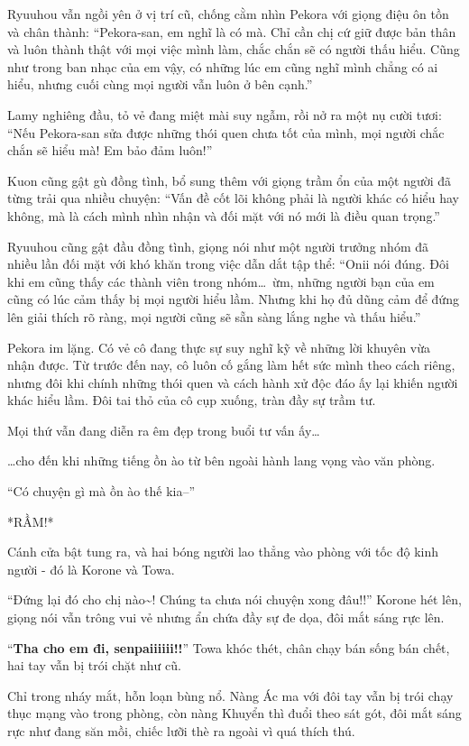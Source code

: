 \documentclass[../main.tex]{subfiles}
\begin{document}
Ryuuhou vẫn ngồi yên ở vị trí cũ, chống cằm nhìn Pekora với giọng điệu ôn tồn và chân thành: ``Pekora-san, em nghĩ là có mà. Chỉ cần chị cứ giữ được bản thân và luôn thành thật với mọi việc mình làm, chắc chắn sẽ có người thấu hiểu. Cũng như trong ban nhạc của em vậy, có những lúc em cũng nghĩ mình chẳng có ai hiểu, nhưng cuối cùng mọi người vẫn luôn ở bên cạnh.''

Lamy nghiêng đầu, tỏ vẻ đang miệt mài suy ngẫm, rồi nở ra một nụ cười tươi: ``Nếu Pekora-san sửa được những thói quen chưa tốt của mình, mọi người chắc chắn sẽ hiểu mà! Em bảo đảm luôn!''

Kuon cũng gật gù đồng tình, bổ sung thêm với giọng trầm ổn của một người đã từng trải qua nhiều chuyện: ``Vấn đề cốt lõi không phải là người khác có hiểu hay không, mà là cách mình nhìn nhận và đối mặt với nó mới là điều quan trọng.''

Ryuuhou cũng gật đầu đồng tình, giọng nói như một người trưởng nhóm đã nhiều lần đối mặt với khó khăn trong việc dẫn dắt tập thể: ``Onii nói đúng. Đôi khi em cũng thấy các thành viên trong nhóm\dots\ ừm, những người bạn của em cũng có lúc cảm thấy bị mọi người hiểu lầm. Nhưng khi họ đủ dũng cảm để đứng lên giải thích rõ ràng, mọi người cũng sẽ sẵn sàng lắng nghe và thấu hiểu.''

Pekora im lặng. Có vẻ cô đang thực sự suy nghĩ kỹ về những lời khuyên vừa nhận được. Từ trước đến nay, cô luôn cố gắng làm hết sức mình theo cách riêng, nhưng đôi khi chính những thói quen và cách hành xử độc đáo ấy lại khiến người khác hiểu lầm. Đôi tai thỏ của cô cụp xuống, tràn đầy sự trầm tư.

Mọi thứ vẫn đang diễn ra êm đẹp trong buổi tư vấn ấy\dots

\dots cho đến khi những tiếng ồn ào từ bên ngoài hành lang vọng vào văn phòng.

``Có chuyện gì mà ồn ào thế kia--''

*RẦM!*

Cánh cửa bật tung ra, và hai bóng người lao thẳng vào phòng với tốc độ kinh người - đó là Korone và Towa.

``Đứng lại đó cho chị nào\~{}! Chúng ta chưa nói chuyện xong đâu!!'' Korone hét lên, giọng nói vẫn trông vui vẻ nhưng ẩn chứa đầy sự đe dọa, đôi mắt sáng rực lên.

``\textbf{Tha cho em đi, senpaiiiiii!!}'' Towa khóc thét, chân chạy bán sống bán chết, hai tay vẫn bị trói chặt như cũ.

Chỉ trong nháy mắt, hỗn loạn bùng nổ. Nàng Ác ma với đôi tay vẫn bị trói chạy thục mạng vào trong phòng, còn nàng Khuyển thì đuổi theo sát gót, đôi mắt sáng rực như đang săn mồi, chiếc lưỡi thè ra ngoài vì quá thích thú.
\end{document}
